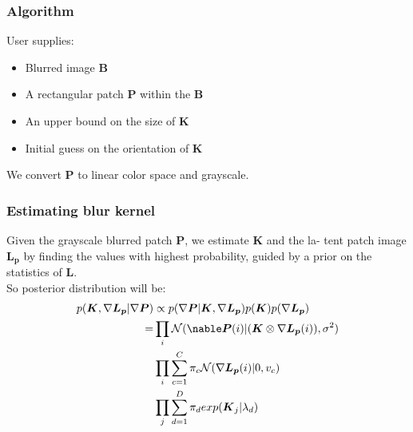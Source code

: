 \documentclass{beamer}
\begin{document}
\begin{frame}
    \frametitle{Algorithm}
    User supplies:
    \begin{itemize}
        \item Blurred image $\boldsymbol{B}$
        \item A rectangular patch $\boldsymbol{P}$ within the $\boldsymbol{B}$
        \item An upper bound on the size of $\boldsymbol{K}$
        \item Initial guess on the orientation of $\boldsymbol{K}$
    \end{itemize}
    We convert $\boldsymbol{P}$ to linear color space and grayscale.
\end{frame}
\begin{frame}
    \frametitle{Estimating blur kernel}
    Given the grayscale blurred patch $\boldsymbol{P}$, we estimate $\boldsymbol{K}$ and the la-
    tent patch image $\boldsymbol{L_p}$ by finding the values with highest probability, guided
    by a prior on the statistics of $\boldsymbol{L}$.
    \pause
    \\So posterior distribution will be:
    \begin{align*}
        p(\boldsymbol{K}, \nabla\boldsymbol{L_p}|\nabla\boldsymbol{P})
        &\propto p(\nabla\boldsymbol{P}|\boldsymbol{K}, \nabla\boldsymbol{L_p})p(\boldsymbol{K})p(\nabla\boldsymbol{L_p}) \\
        = &\prod_{i} \mathcal{N}(\nable\boldsymbol{P}(i)|(\boldsymbol{K}\otimes\nabla\boldsymbol{L_p}(i)), \sigma^2) \\
          &\prod_{i}\sum_{c=1}^{C} \pi_c \mathcal{N}(\nabla\boldsymbol{L_p}(i)|0,v_c) \\
          &\prod_{j}\sum_{d=1}^{D} \pi_d exp(\boldsymbol{K}_j|\lambda_d)
    \end{align*}
\end{frame}
\end{document}

